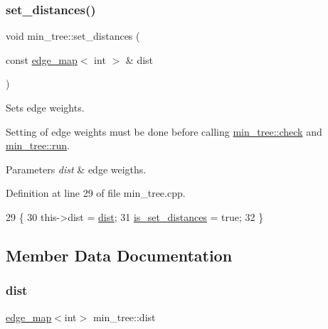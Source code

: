 \mbox{\label{classmin__tree_a0f3eb1714b7859576037cf4b991b16cb}} 
\subsubsection{\texorpdfstring{set\+\_\+distances()}{set\_distances()}}
{\footnotesize\ttfamily void min\+\_\+tree\+::set\+\_\+distances (\begin{DoxyParamCaption}\item[{const \mbox{\hyperlink{classedge__map}{edge\+\_\+map}}$<$ int $>$ \&}]{dist }\end{DoxyParamCaption})}



Sets edge weights. 

Setting of edge weights must be done before calling \mbox{\hyperlink{classmin__tree_ad87b1bfbc687ad943c07538fa0c3d270}{min\+\_\+tree\+::check}} and \mbox{\hyperlink{classmin__tree_ac025e8dad0db7a6a1e0e7b476b547802}{min\+\_\+tree\+::run}}.


\begin{DoxyParams}{Parameters}
{\em dist} & edge weigths. \\
\hline
\end{DoxyParams}


Definition at line 29 of file min\+\_\+tree.\+cpp.


\begin{DoxyCode}
29                                                        \{ 
30     this->dist = \mbox{\hyperlink{classmin__tree_ae612767aa8e3eb3bedd1dadd7c68f99c}{dist}};
31     \mbox{\hyperlink{classmin__tree_a7c2ec16bd1799571bc057630262a3a03}{is\_set\_distances}} = \textcolor{keyword}{true};
32 \}
\end{DoxyCode}


\subsection{Member Data Documentation}
\mbox{\label{classmin__tree_ae612767aa8e3eb3bedd1dadd7c68f99c}} 
\subsubsection{\texorpdfstring{dist}{dist}}
{\footnotesize\ttfamily \mbox{\hyperlink{classedge__map}{edge\+\_\+map}}$<$int$>$ min\+\_\+tree\+::dist\hspace{0.3cm}{\ttfamily [private]}}



